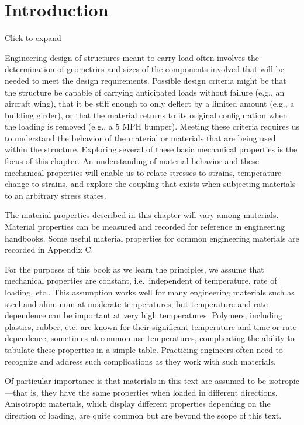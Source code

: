 \documentclass[
  letterpaper,
  DIV=11,
  numbers=noendperiod]{scrreprt}
\begin{document}
\section*{Introduction}\label{introduction-4}


Click to expand

Engineering design of structures meant to carry load often involves the
determination of geometries and sizes of the components involved that
will be needed to meet the design requirements. Possible design criteria
might be that the structure be capable of carrying anticipated loads
without failure (e.g., an aircraft wing), that it be stiff enough to
only deflect by a limited amount (e.g., a building girder), or that the
material returns to its original configuration when the loading is
removed (e.g., a 5 MPH bumper). Meeting these criteria requires us to
understand the behavior of the material or materials that are being used
within the structure. Exploring several of these basic mechanical
properties is the focus of this chapter. An understanding of material
behavior and these mechanical properties will enable us to relate
stresses to strains, temperature change to strains, and explore the
coupling that exists when subjecting materials to an arbitrary stress
states.

The material properties described in this chapter will vary among
materials. Material properties can be measured and recorded for
reference in engineering handbooks. Some useful material properties for
common engineering materials are recorded in Appendix C.

For the purposes of this book as we learn the principles, we assume that
mechanical properties are constant, i.e.~independent of temperature,
rate of loading, etc.. This assumption works well for many engineering
materials such as steel and aluminum at moderate temperatures, but
temperature and rate dependence can be important at very high
temperatures. Polymers, including plastics, rubber, etc. are known for
their significant temperature and time or rate dependence, sometimes at
common use temperatures, complicating the ability to tabulate these
properties in a simple table. Practicing engineers often need to
recognize and address such complications as they work with such
materials.

Of particular importance is that materials in this text are assumed to
be isotropic---that is, they have the same properties when loaded in
different directions. Anisotropic materials, which display different
properties depending on the direction of loading, are quite common but
are beyond the scope of this text.
\end{document}
